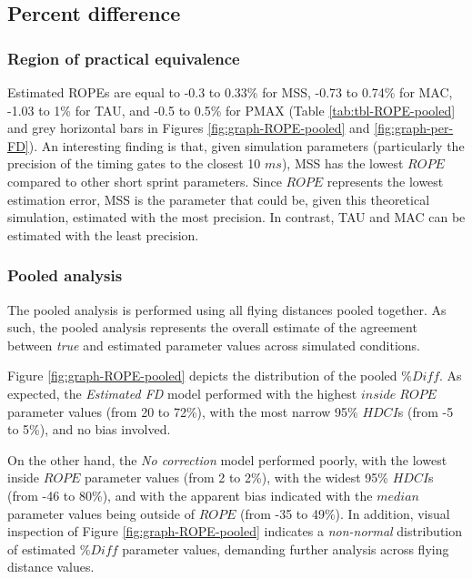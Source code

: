 \documentclass[fleqn,10pt,lineno]{wlpeerj} %
\begin{document}
\hypertarget{percent-difference}{%
\subsection{Percent difference}\label{percent-difference}}

\hypertarget{region-of-practical-equivalence}{%
\subsubsection{Region of practical equivalence}\label{region-of-practical-equivalence}}

Estimated ROPEs are equal to -0.3 to 0.33\% for MSS, -0.73 to 0.74\% for MAC, -1.03 to 1\% for TAU, and -0.5 to 0.5\% for PMAX (Table \ref{tab:tbl-ROPE-pooled} and grey horizontal bars in Figures \ref{fig:graph-ROPE-pooled} and \ref{fig:graph-per-FD}). An interesting finding is that, given simulation parameters (particularly the precision of the timing gates to the closest 10 \(ms\)), MSS has the lowest \(ROPE\) compared to other short sprint parameters. Since \(ROPE\) represents the lowest estimation error, MSS is the parameter that could be, given this theoretical simulation, estimated with the most precision. In contrast, TAU and MAC can be estimated with the least precision.

\hypertarget{pooled-analysis}{%
\subsubsection{Pooled analysis}\label{pooled-analysis}}

The pooled analysis is performed using all flying distances pooled together. As such, the pooled analysis represents the overall estimate of the agreement between \emph{true} and estimated parameter values across simulated conditions.

Figure \ref{fig:graph-ROPE-pooled} depicts the distribution of the pooled \(\%Diff\). As expected, the \emph{Estimated FD} model performed with the highest \(inside \; ROPE\) parameter values (from 20 to 72\%), with the most narrow 95\% \(HDCI\)s (from -5 to 5\%), and no bias involved.

On the other hand, the \emph{No correction} model performed poorly, with the lowest inside \(ROPE\) parameter values (from 2 to 2\%), with the widest 95\% \(HDCI\)s (from -46 to 80\%), and with the apparent bias indicated with the \(median\) parameter values being outside of \(ROPE\) (from -35 to 49\%). In addition, visual inspection of Figure \ref{fig:graph-ROPE-pooled} indicates a \emph{non-normal} distribution of estimated \(\%Diff\) parameter values, demanding further analysis across flying distance values.
\end{document}
